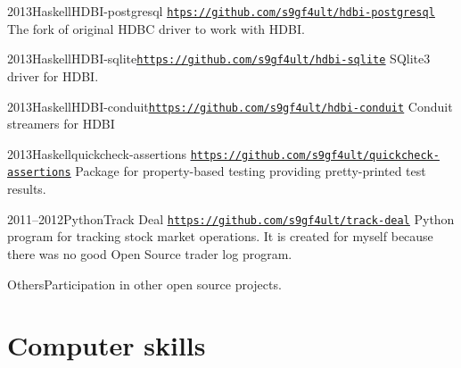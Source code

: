 \documentclass[11pt,a4paper,sans]{moderncv}
\newcommand*{\hlink}[1]{\textcolor{blue}{\texttt{\underline{\href{#1}{#1}}}}}
\begin{document}
\cventry
    {2013}{Haskell}{HDBI-postgresql}%
    {\hlink{htps://github.com/s9gf4ult/hdbi-postgresql}}{}
    {The fork of original HDBC driver to work with HDBI.}

\cventry
    {2013}{Haskell}{HDBI-sqlite}{\hlink{https://github.com/s9gf4ult/hdbi-sqlite}}{}
    {SQlite3 driver for HDBI.}

\cventry
    {2013}{Haskell}{HDBI-conduit}{\hlink{https://github.com/s9gf4ult/hdbi-conduit}}{}
    {Conduit streamers for HDBI}

\cventry
    {2013}{Haskell}{quickcheck-assertions}%
    {\hlink{https://github.com/s9gf4ult/quickcheck-assertions}}{}{%
      Package for property-based testing providing pretty-printed test results.}

\cventry
    {2011--2012}{Python}{Track Deal}%
    {\hlink{https://github.com/s9gf4ult/track-deal}}{}
    {Python program for tracking stock market operations. It is created for
      myself because there was no good Open Source trader log program.}

\cvitem
    {Others}{Participation in other open source projects.}


\section{Computer skills}

\end{document}
